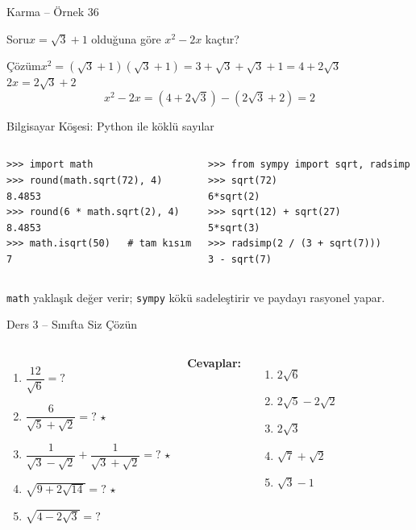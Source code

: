 \documentclass[aspectratio=169,11pt]{beamer}
\newcommand{\soru}[3]{%
\begin{frame}{#1}
  \begin{block}{Soru}\large #2\end{block}
  \pause
  \begin{exampleblock}{Çözüm}\large #3\end{exampleblock}
\end{frame}}
\begin{document}
\soru{Karma -- Örnek 36}
{\(x=\sqrt3+1\) olduğuna göre \(x^2-2x\) kaçtır?}
{\(x^2=(\sqrt3+1)(\sqrt3+1)=3+\sqrt3+\sqrt3+1=4+2\sqrt3\)\\[3pt]
\(2x=2\sqrt3+2\)
\[x^2-2x=(4+2\sqrt3)-(2\sqrt3+2)=2\]}

\begin{frame}[fragile]{Bilgisayar Köşesi: Python ile köklü sayılar}
\begin{columns}[t]
\begin{verbatim}
>>> import math
>>> round(math.sqrt(72), 4)
8.4853
>>> round(6 * math.sqrt(2), 4)
8.4853
>>> math.isqrt(50)   # tam kısım
7
\end{verbatim}
\begin{verbatim}
>>> from sympy import sqrt, radsimp
>>> sqrt(72)
6*sqrt(2)
>>> sqrt(12) + sqrt(27)
5*sqrt(3)
>>> radsimp(2 / (3 + sqrt(7)))
3 - sqrt(7)
\end{verbatim}
\end{columns}
\small \verb|math| yaklaşık değer verir; \verb|sympy| kökü sadeleştirir ve paydayı rasyonel yapar.
\end{frame}

\begin{frame}{Ders 3 -- Sınıfta Siz Çözün}
\begin{columns}[t]
\begin{enumerate}
\item \(\dfrac{12}{\sqrt6}=?\)
\item \(\dfrac{6}{\sqrt5+\sqrt2}=?\) \(\star\)
\item \(\dfrac{1}{\sqrt3-\sqrt2}+\dfrac{1}{\sqrt3+\sqrt2}=?\) \(\star\)
\item \(\sqrt{9+2\sqrt{14}}=?\) \(\star\)
\item \(\sqrt{4-2\sqrt3}=?\)
\end{enumerate}
\pause
\textbf{Cevaplar:}
\begin{enumerate}
\item \(2\sqrt6\)
\item \(2\sqrt5-2\sqrt2\)
\item \(2\sqrt3\)
\item \(\sqrt7+\sqrt2\)
\item \(\sqrt3-1\)
\end{enumerate}
\end{columns}
\vspace{4pt}{\footnotesize \(\star\) işaretli soruların adım adım çözümü sonraki slaytlardadır.}
\end{frame}
\end{document}
